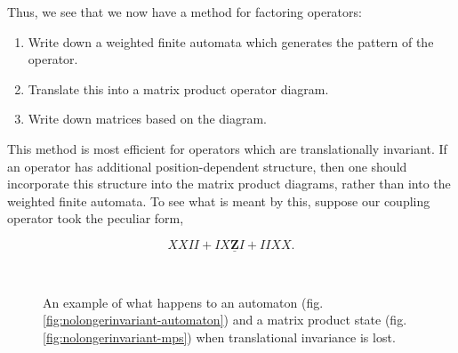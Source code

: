 \documentclass[12pt]{amsbook}
\theoremstyle{plain}
\theoremstyle{definition}
\theoremstyle{remark}
\begin{document}
Thus, we see that we now have a method for factoring operators:

\begin{enumerate}
\item Write down a weighted finite automata which generates the pattern of the operator.
\item Translate this into a matrix product operator diagram.
\item Write down matrices based on the diagram.
\end{enumerate}

This method is most efficient for operators which are translationally invariant.  If an operator has additional position-dependent structure, then one should incorporate this structure into the matrix product diagrams, rather than into the weighted finite automata.  To see what is meant by this, suppose our coupling operator took the peculiar form,

$$XXII + IX\underline{\textbf{Z}}I + IIXX.$$

\begin{figure}
\\
\caption{An example of what happens to an automaton (fig. \ref{fig:nolongerinvariant-automaton}) and a matrix product state (fig. \ref{fig:nolongerinvariant-mps}) when translational invariance is lost.}
\end{figure}
\end{document}
